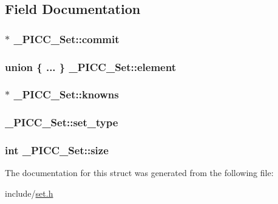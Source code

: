 \subsection{Field Documentation}
\hypertarget{struct__PICC__Set_a64527043126276defd03f9a32445f0e1}{
\subsubsection[{commit}]{$\ast$ \-\_\-\-P\-I\-C\-C\-\_\-\-Set\-::commit}}\label{struct__PICC__Set_a64527043126276defd03f9a32445f0e1}
\hypertarget{struct__PICC__Set_a16102b7212f244b0043331180144f6b0}{
\subsubsection[{element}]{\setlength{\rightskip}{0pt plus 5cm}union \{ ... \}   \-\_\-\-P\-I\-C\-C\-\_\-\-Set\-::element}}\label{struct__PICC__Set_a16102b7212f244b0043331180144f6b0}
\hypertarget{struct__PICC__Set_a4080232ebc5e47b3a1e8b924eb58eaeb}{
\subsubsection[{knowns}]{$\ast$ \-\_\-\-P\-I\-C\-C\-\_\-\-Set\-::knowns}}\label{struct__PICC__Set_a4080232ebc5e47b3a1e8b924eb58eaeb}
\hypertarget{struct__PICC__Set_ae5656c6be8745315fe61a6e4be532bec}{
\subsubsection[{set\-\_\-type}]{ \-\_\-\-P\-I\-C\-C\-\_\-\-Set\-::set\-\_\-type}}\label{struct__PICC__Set_ae5656c6be8745315fe61a6e4be532bec}
\hypertarget{struct__PICC__Set_ae294350a9386f6e656de3b851a18b651}{
\subsubsection[{size}]{\setlength{\rightskip}{0pt plus 5cm}int \-\_\-\-P\-I\-C\-C\-\_\-\-Set\-::size}}\label{struct__PICC__Set_ae294350a9386f6e656de3b851a18b651}


The documentation for this struct was generated from the following file\-:\begin{DoxyCompactItemize}
\item 
include/\hyperlink{set_8h}{set.\-h}\end{DoxyCompactItemize}
